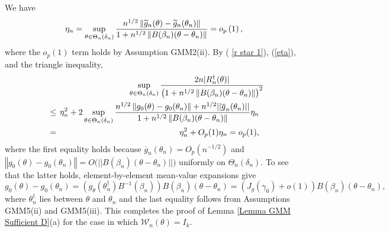 \documentclass[12pt,thmsb,titlepage,final,oneside,letterpaper]{article}
\begin{document}
We have 
\begin{equation}
\eta _{n}=\sup_{\theta \in \Theta _{n}\left( \delta _{n}\right) }\frac{%
n^{1/2}\left\Vert \widetilde{g}_{n}(\theta )-\widetilde{g}_{n}(\theta
_{n})\right\Vert }{1+n^{1/2}\left\Vert B(\beta _{n})(\theta -\theta
_{n})\right\Vert }=o_{p}\left( 1\right) ,  \label{eta}
\end{equation}%
where the $o_{p}\left( 1\right) $ term holds by Assumption GMM2(ii)$.$ By (%
\ref{r star 1}), (\ref{eta}), and the triangle inequality,%
\begin{eqnarray}
&&\hspace{-0.08in}\sup_{\theta \in \Theta _{n}\left( \delta _{n}\right) }%
\frac{2n|R_{n}^{\dag }(\theta )|}{\left( 1+n^{1/2}\left\Vert B(\beta
_{n})(\theta -\theta _{n})\right\Vert \right) ^{2}}\hspace{-0.08in}  \notag
\\
&\leq &\hspace{-0.08in}\eta _{n}^{2}+2\sup_{\theta \in \Theta _{n}\left(
\delta _{n}\right) }\frac{n^{1/2}\left\Vert g_{0}(\theta )-g_{0}(\theta
_{n})\right\Vert +n^{1/2}||\overline{g}_{n}(\theta _{n})||}{%
1+n^{1/2}\left\Vert B(\beta _{n})(\theta -\theta _{n})\right\Vert }\eta _{n}
\notag \\
&=&\hspace{-0.08in}\eta _{n}^{2}+O_{p}(1)\eta _{n}=o_{p}(1),
\end{eqnarray}%
where the first equality holds because $\overline{g}_{n}\left( \theta
_{n}\right) =O_{p}(n^{-1/2})$ and $\left\Vert g_{0}\left( \theta \right)
-g_{0}\left( \theta _{n}\right) \right\Vert =O(||B(\beta _{n})$\allowbreak $%
(\theta -\theta _{n})||)$ uniformly on $\Theta _{n}\left( \delta _{n}\right)
.$ To see that the latter holds, element-by-element mean-value expansions
give%
\begin{equation}
g_{0}\left( \theta \right) -g_{0}\left( \theta _{n}\right) =(g_{\theta
}(\theta _{n}^{\dag })B^{-1}(\beta _{n}))B\left( \beta _{n}\right) \left(
\theta -\theta _{n}\right) =\left( J_{g}(\gamma _{0})+o\left( 1\right)
\right) B\left( \beta _{n}\right) \left( \theta -\theta _{n}\right) ,
\label{G diff}
\end{equation}%
where $\theta _{n}^{\dag }$ lies between $\theta $ and $\theta _{n}$ and the
last equality follows from Assumptions GMM5(ii) and GMM5(iii). This
completes the proof of Lemma \ref{Lemma GMM Sufficient D}(a) for the case in
which $\mathcal{W}_{n}\left( \theta \right) =I_{k}.$
\end{document}
